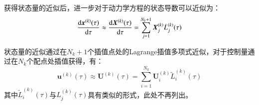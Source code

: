 获得状态量的近似后，进一步对于动力学方程的状态导数可以近似为：
\begin{equation}
	\frac{\mathop{}\!\mathrm{d} \boldsymbol{x}^{(k)}(\tau)}{\mathop{}\!\mathrm{d} \tau} \approx \frac{\mathop{}\!\mathrm{d} \boldsymbol{X}^{(k)}(\tau)}{\mathop{}\!\mathrm{d} \tau}=\sum_{j=1}^{N_{k}+1} \boldsymbol{X}_{j}^{(k)} \dot{L}_{j}^{(k)}(\tau)
\end{equation}

状态量的近似通过在$ N_k+1 $个插值点处的Lagrange插值多项式近似，对于控制量通过在$ N_k $个配点处插值获得，有：
\begin{equation}
	\boldsymbol{u}^{(k)}(\tau) \approx \boldsymbol{U}^{(k)}(\tau)=\sum_{i=1}^{N_{k}} \boldsymbol{U}_{i}^{(k)}\widetilde{L}_{i}^{(k)}(\tau)
	\label{eq:control}
\end{equation}
其中$ \widetilde{L}_{i}^{(k)}(\tau) $与$ L_{j}^{(k)}(\tau) $具有类似的形式，此处不再列出。

